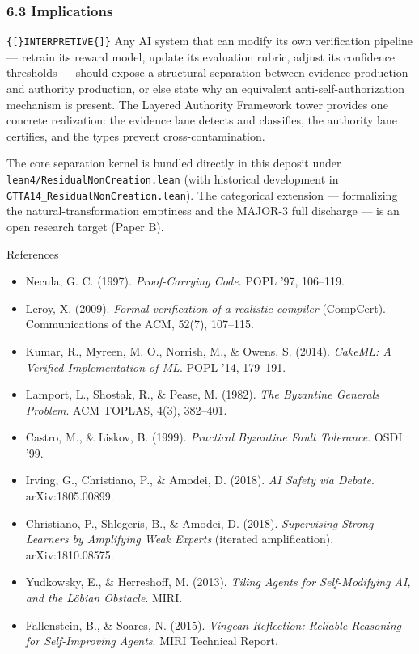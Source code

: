 \documentclass[
  10pt,
]{article}
\providecommand{\tightlist}{%
  \setlength{\itemsep}{0pt}\setlength{\parskip}{0pt}}
\providecommand{\tightlist}{%
  \setlength{\itemsep}{0pt}\setlength{\parskip}{0pt}}
\DeclareRobustCommand{\texttt}[1]{{\paperSymbolFont\nolinkurl{#1}}}
\begin{document}
\subsubsection{6.3 Implications}\label{implications}

\texttt{{[}INTERPRETIVE{]}} Any AI system that can modify its own verification pipeline --- retrain its reward model, update its evaluation rubric, adjust its confidence thresholds --- should expose a structural separation between evidence production and authority production, or else state why an equivalent anti-self-authorization mechanism is present. The Layered Authority Framework tower provides one concrete realization: the evidence lane detects and classifies, the authority lane certifies, and the types prevent cross-contamination.

The core separation kernel is bundled directly in this deposit under \texttt{lean4/ResidualNonCreation.lean} (with historical development in \texttt{GTTA14\_ResidualNonCreation.lean}). The categorical extension --- formalizing the natural-transformation emptiness and the MAJOR-3 full discharge --- is an open research target (Paper B).

References

\begin{itemize}
\tightlist
\item
  Necula, G. C. (1997). \emph{Proof-Carrying Code}. POPL '97, 106--119.
\item
  Leroy, X. (2009). \emph{Formal verification of a realistic compiler} (CompCert). Communications of the ACM, 52(7), 107--115.
\item
  Kumar, R., Myreen, M. O., Norrish, M., \& Owens, S. (2014). \emph{CakeML: A Verified Implementation of ML}. POPL '14, 179--191.
\item
  Lamport, L., Shostak, R., \& Pease, M. (1982). \emph{The Byzantine Generals Problem}. ACM TOPLAS, 4(3), 382--401.
\item
  Castro, M., \& Liskov, B. (1999). \emph{Practical Byzantine Fault Tolerance}. OSDI '99.
\item
  Irving, G., Christiano, P., \& Amodei, D. (2018). \emph{AI Safety via Debate}. arXiv:1805.00899.
\item
  Christiano, P., Shlegeris, B., \& Amodei, D. (2018). \emph{Supervising Strong Learners by Amplifying Weak Experts} (iterated amplification). arXiv:1810.08575.
\item
  Yudkowsky, E., \& Herreshoff, M. (2013). \emph{Tiling Agents for Self-Modifying AI, and the Löbian Obstacle}. MIRI.
\item
  Fallenstein, B., \& Soares, N. (2015). \emph{Vingean Reflection: Reliable Reasoning for Self-Improving Agents}. MIRI Technical Report.
\end{itemize}
\end{document}
